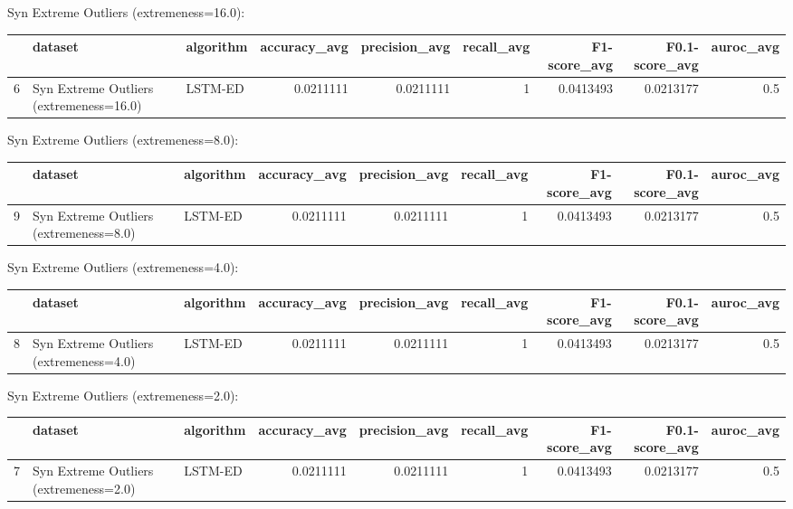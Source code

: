 Syn Extreme Outliers (extremeness=16.0):

\begin{tabular}{rllrrrrrr}
\hline
    & dataset                                 & algorithm   &   accuracy\_avg &   precision\_avg &   recall\_avg &   F1-score\_avg &   F0.1-score\_avg &   auroc\_avg \\
\hline
  6 & Syn Extreme Outliers (extremeness=16.0) & LSTM-ED     &      0.0211111 &       0.0211111 &            1 &      0.0413493 &        0.0213177 &         0.5 \\
\hline
\end{tabular}

Syn Extreme Outliers (extremeness=8.0):

\begin{tabular}{rllrrrrrr}
\hline
    & dataset                                & algorithm   &   accuracy\_avg &   precision\_avg &   recall\_avg &   F1-score\_avg &   F0.1-score\_avg &   auroc\_avg \\
\hline
  9 & Syn Extreme Outliers (extremeness=8.0) & LSTM-ED     &      0.0211111 &       0.0211111 &            1 &      0.0413493 &        0.0213177 &         0.5 \\
\hline
\end{tabular}

Syn Extreme Outliers (extremeness=4.0):

\begin{tabular}{rllrrrrrr}
\hline
    & dataset                                & algorithm   &   accuracy\_avg &   precision\_avg &   recall\_avg &   F1-score\_avg &   F0.1-score\_avg &   auroc\_avg \\
\hline
  8 & Syn Extreme Outliers (extremeness=4.0) & LSTM-ED     &      0.0211111 &       0.0211111 &            1 &      0.0413493 &        0.0213177 &         0.5 \\
\hline
\end{tabular}

Syn Extreme Outliers (extremeness=2.0):

\begin{tabular}{rllrrrrrr}
\hline
    & dataset                                & algorithm   &   accuracy\_avg &   precision\_avg &   recall\_avg &   F1-score\_avg &   F0.1-score\_avg &   auroc\_avg \\
\hline
  7 & Syn Extreme Outliers (extremeness=2.0) & LSTM-ED     &      0.0211111 &       0.0211111 &            1 &      0.0413493 &        0.0213177 &         0.5 \\
\hline
\end{tabular}

